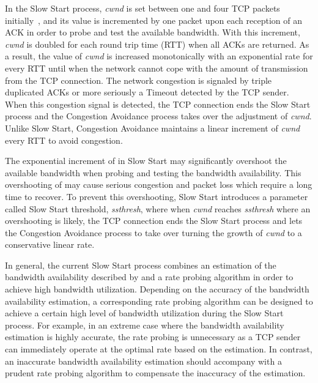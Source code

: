 \documentclass[12pt,onecolumn]{IEEEtran}
\begin{document}
In the Slow Start process, \emph{cwnd} is set between one and four TCP packets
initially~\cite{initial1}, and its value is incremented by one packet upon each
reception of an ACK in order to probe and test the available bandwidth. With
this increment, \emph{cwnd} is doubled for each round trip time (RTT) when all
ACKs are returned. As a result, the value of \emph{cwnd} is increased
monotonically with an exponential rate for every RTT until when the network
cannot cope with the amount of transmission from the TCP connection. The
network congestion is signaled by triple duplicated ACKs or more seriously a
Timeout detected by the TCP sender. When this congestion signal is detected,
the TCP connection ends the Slow Start process and the Congestion Avoidance
process takes over the adjustment of \emph{cwnd}. Unlike Slow Start, Congestion
Avoidance maintains a linear increment of \emph{cwnd} every RTT to avoid
congestion.

The exponential increment of  in Slow Start may significantly overshoot
the available bandwidth when probing and testing the bandwidth availability.
This overshooting of  may cause serious congestion and packet loss which
require a long time to recover. To prevent this overshooting, Slow Start
introduces a parameter called Slow Start threshold, \emph{ssthresh}, where when
\emph{cwnd} reaches \emph{ssthresh} where an overshooting is likely, the TCP
connection ends the Slow Start process and lets the Congestion Avoidance
process to take over turning the growth of \emph{cwnd} to a conservative linear
rate.

In general, the current Slow Start process combines an estimation of the
bandwidth availability described by  and a rate probing algorithm in
order to achieve high bandwidth utilization. Depending on the accuracy of the
bandwidth availability estimation, a corresponding rate probing algorithm can
be designed to achieve a certain high level of bandwidth utilization during the
Slow Start process. For example, in an extreme case where the bandwidth
availability estimation is highly accurate, the rate probing is unnecessary as
a TCP sender can immediately operate at the optimal rate based on the
estimation. In contrast, an inaccurate bandwidth availability estimation should
accompany with a prudent rate probing algorithm to compensate the inaccuracy of
the estimation.
\end{document}
